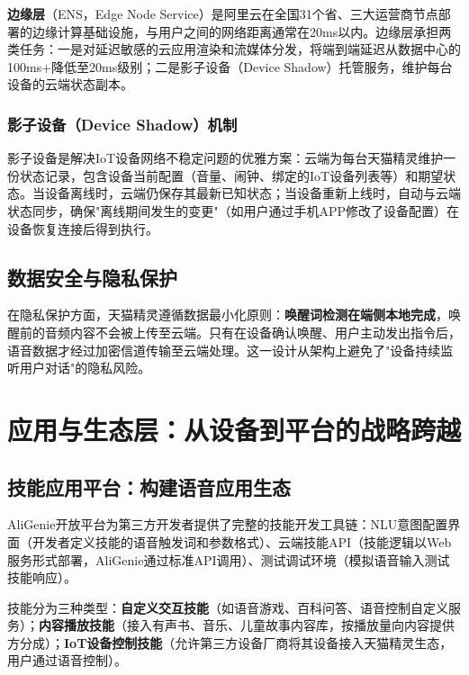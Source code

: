 \documentclass[12pt, a4paper, twoside, openright]{book}
\begin{document}
\textbf{边缘层}（ENS，Edge Node Service）是阿里云在全国31个省、三大运营商节点部署的边缘计算基础设施，与用户之间的网络距离通常在20ms以内。边缘层承担两类任务：一是对延迟敏感的云应用渲染和流媒体分发，将端到端延迟从数据中心的100ms+降低至20ms级别；二是影子设备（Device Shadow）托管服务，维护每台设备的云端状态副本。

\subsection{影子设备（Device Shadow）机制}

影子设备是解决IoT设备网络不稳定问题的优雅方案：云端为每台天猫精灵维护一份状态记录，包含设备当前配置（音量、闹钟、绑定的IoT设备列表等）和期望状态。当设备离线时，云端仍保存其最新已知状态；当设备重新上线时，自动与云端状态同步，确保"离线期间发生的变更"（如用户通过手机APP修改了设备配置）在设备恢复连接后得到执行。

\section{数据安全与隐私保护}

在隐私保护方面，天猫精灵遵循数据最小化原则：\textbf{唤醒词检测在端侧本地完成}，唤醒前的音频内容不会被上传至云端。只有在设备确认唤醒、用户主动发出指令后，语音数据才经过加密信道传输至云端处理。这一设计从架构上避免了"设备持续监听用户对话"的隐私风险。

\chapter{应用与生态层：从设备到平台的战略跨越}
\label{chap:ecosystem}

\section{技能应用平台：构建语音应用生态}

AliGenie开放平台为第三方开发者提供了完整的技能开发工具链：NLU意图配置界面（开发者定义技能的语音触发词和参数格式）、云端技能API（技能逻辑以Web服务形式部署，AliGenie通过标准API调用）、测试调试环境（模拟语音输入测试技能响应）。

技能分为三种类型：\textbf{自定义交互技能}（如语音游戏、百科问答、语音控制自定义服务）；\textbf{内容播放技能}（接入有声书、音乐、儿童故事内容库，按播放量向内容提供方分成）；\textbf{IoT设备控制技能}（允许第三方设备厂商将其设备接入天猫精灵生态，用户通过语音控制）。
\end{document}
